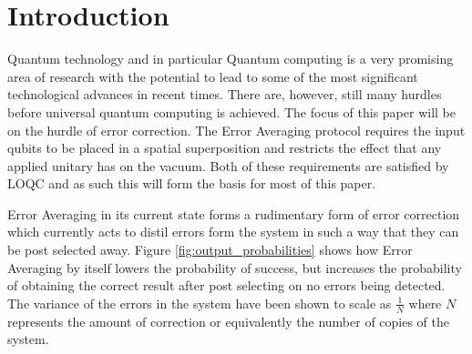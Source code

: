 \documentclass[aps,pra,twocolumn,superscriptaddress,numerical,floatfix]{revtex4-1}
\begin{document}
\pacs{}

\maketitle

\section{Introduction \label{intro}}
Quantum technology and in particular Quantum computing is a very promising area of research with the potential to lead to some of the most significant technological advances in recent times. There are, however, still many hurdles before universal quantum computing is achieved. The focus of this paper will be on the hurdle of error correction. The Error Averaging protocol requires the input qubits to be placed in a spatial superposition and restricts the effect that any applied unitary has on the vacuum. Both of these requirements are satisfied by LOQC and as such this will form the basis for most of this paper.

Error Averaging in its current state forms a rudimentary form of error correction which currently acts to distil errors form the system in such a way that they can be post selected away. Figure \ref{fig:output_probabilities} shows how Error Averaging by itself lowers the probability of success, but increases the probability of obtaining the correct result after post selecting on no errors being detected. The variance of the errors in the system have been shown to scale as $\frac{1}{N}$ where $N$ represents the amount of correction or equivalently the number of copies of the system.
\end{document}
